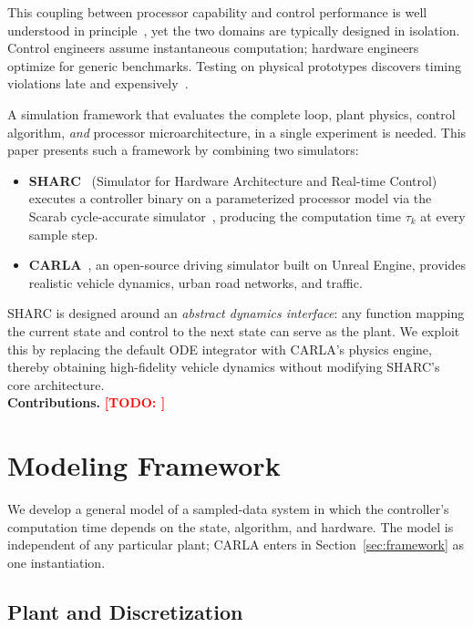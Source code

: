 \documentclass[conference]{IEEEtran}
\newcommand{\TODO}[1]{\textcolor{red}{\textbf{[TODO: #1]}}}
\begin{document}
This coupling between processor capability and control performance
is well understood in
principle~\cite{caccamo2002overruns,findeisen2011robust_delay},
yet the two domains are typically designed in isolation.  Control
engineers assume instantaneous computation; hardware engineers
optimize for generic benchmarks.  Testing on physical prototypes
discovers timing violations late and
expensively~\cite{mihalic2022hil}.

A simulation framework that evaluates the complete loop, plant
physics, control algorithm, \emph{and} processor
microarchitecture, in a single experiment is needed.  This paper
presents such a framework by combining two simulators:
\begin{itemize}
  \item \textbf{SHARC}~\cite{wintz2025sharc} (Simulator for
    Hardware Architecture and Real-time Control) executes a
    controller binary on a parameterized processor model via the
    Scarab cycle-accurate simulator~\cite{scarab}, producing the
    computation time $\tau_k$ at every sample step.
  \item \textbf{CARLA}~\cite{dosovitskiy2017carla}, an open-source
    driving simulator built on Unreal Engine, provides realistic
    vehicle dynamics, urban road networks, and traffic.
\end{itemize}
SHARC is designed around an \emph{abstract dynamics interface}:
any function mapping the current state and control to the next
state can serve as the plant.  We exploit this by replacing the
default ODE integrator with CARLA's physics engine, thereby
obtaining high-fidelity vehicle dynamics without modifying SHARC's
core architecture.\\
\noindent\textbf{Contributions.}
\TODO{}

\section{Modeling Framework}\label{sec:model}

We develop a general model of a sampled-data system in which
the controller's computation time depends on the state, algorithm,
and hardware.  The model is independent of any particular plant;
CARLA enters in Section~\ref{sec:framework} as one instantiation.

\subsection{Plant and Discretization}
\end{document}
